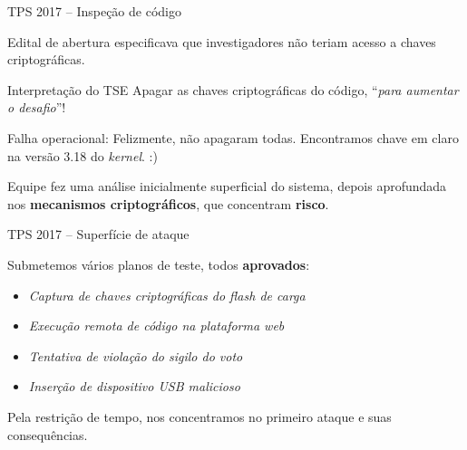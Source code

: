 \documentclass[10pt]{beamer}
\begin{document}
\begin{frame}[fragile]{TPS 2017 -- Inspeção de código}

Edital de abertura especificava que investigadores não teriam acesso a chaves criptográficas.

\bigskip

\begin{block}{Interpretação do TSE}
Apagar as chaves criptográficas do código, ``\emph{para aumentar o desafio}''!
\end{block}

\bigskip
\pause

\alert{Falha operacional:} Felizmente, não apagaram todas. Encontramos chave em claro na versão 3.18 do \emph{kernel}. :)

\bigskip

Equipe fez uma análise inicialmente superficial do sistema, depois aprofundada nos {\bf mecanismos criptográficos}, que concentram \textbf{risco}.

\end{frame}

\begin{frame}{TPS 2017 -- Superfície de ataque}

Submetemos vários planos de teste, todos \textbf{aprovados}:
\begin{itemize}
 \item \emph{Captura de chaves criptográficas do \emph{flash} de carga}
 \item \emph{Execução remota de código na plataforma web}
 \item \emph{Tentativa de violação do sigilo do voto}
 \item \emph{Inserção de dispositivo USB malicioso}
\end{itemize}

Pela restrição de tempo, nos concentramos no primeiro ataque e suas consequências.

\end{frame}
\end{document}
